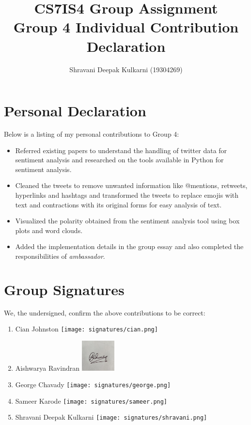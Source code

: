 \documentclass[a4paper,10pt]{article}
\begin{document}
\title{
    CS7IS4 Group Assignment \\
    \large Group 4 Individual Contribution Declaration
}
\author{
    Shravani Deepak Kulkarni (19304269)
}

\maketitle

\section{Personal Declaration}

Below is a listing of my personal contributions to Group 4:

\begin{itemize}
    \item{
    	Referred existing papers to understand the handling of twitter data for sentiment analysis and researched on the tools available in Python for sentiment analysis.
    }
    \item{
    	Cleaned the tweets to remove unwanted information like @mentions, retweets, hyperlinks and hashtags and transformed the tweets to replace emojis with text and contractions with its original forms for easy analysis of text.
	}
    \item{
    	Visualized the polarity obtained from the sentiment analysis tool using box plots and word clouds.
    }
    \item{
    	Added the implementation details in the group essay and also completed the responsibilities of \textit{ambassador}.
    }
    
\end{itemize}

\section{Group Signatures}

We, the undersigned, confirm the above contributions to be correct:

\begin{enumerate}
    \item{
        Cian Johnston \texttt{[image: signatures/cian.png]}
    }
    \item{
        Aishwarya Ravindran \includegraphics[width=0.7in]{signatures/Aishwarya.jpeg}
    }
    \item{
        George Chavady \texttt{[image: signatures/george.png]}
    }
    \item{
        Sameer Karode \texttt{[image: signatures/sameer.png]}
    }
    \item{
        Shravani Deepak Kulkarni \texttt{[image: signatures/shravani.png]}
    }

\end{enumerate}
\end{document}
